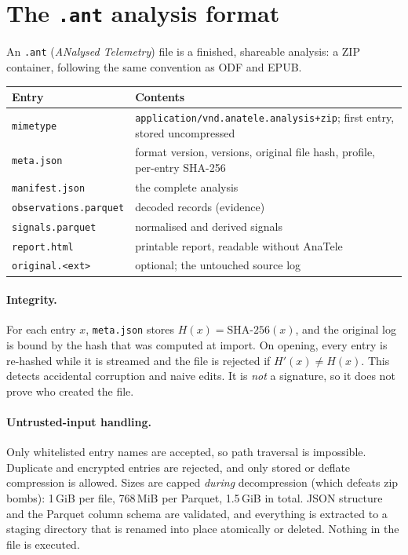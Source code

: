 \documentclass[11pt,a4paper]{article}
\newcommand{\code}[1]{\texttt{#1}}
\begin{document}
\section{The \texorpdfstring{\code{.ant}}{.ant} analysis format}

An \code{.ant} (\emph{ANalysed Telemetry}) file is a finished, shareable analysis: a ZIP container,
following the same convention as ODF and EPUB.

\begin{center}
\begin{tabularx}{\linewidth}{@{}lX@{}}
\toprule
Entry & Contents \\
\midrule
\code{mimetype} & \code{application/vnd.anatele.analysis+zip}; first entry, stored uncompressed \\
\code{meta.json} & format version, versions, original file hash, profile, per-entry SHA-256 \\
\code{manifest.json} & the complete analysis \\
\code{observations.parquet} & decoded records (evidence) \\
\code{signals.parquet} & normalised and derived signals \\
\code{report.html} & printable report, readable without AnaTele \\
\code{original.<ext>} & optional; the untouched source log \\
\bottomrule
\end{tabularx}
\end{center}

\paragraph{Integrity.} For each entry $x$, \code{meta.json} stores $H(x)=\mathrm{SHA\text{-}256}(x)$,
and the original log is bound by the hash that was computed at import. On opening, every entry is
re-hashed while it is streamed and the file is rejected if $H'(x)\ne H(x)$. This detects accidental
corruption and naive edits. It is \emph{not} a signature, so it does not prove who created the file.

\paragraph{Untrusted-input handling.} Only whitelisted entry names are accepted, so path traversal
is impossible. Duplicate and encrypted entries are rejected, and only stored or deflate compression
is allowed. Sizes are capped \emph{during} decompression (which defeats zip bombs):
1\,GiB per file, 768\,MiB per Parquet, 1.5\,GiB in total. JSON structure and the Parquet column
schema are validated, and everything is extracted to a staging directory that is renamed into place
atomically or deleted. Nothing in the file is executed.
\end{document}
